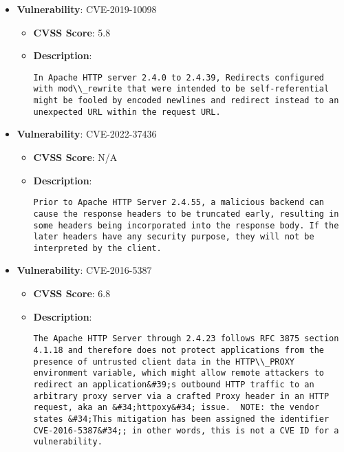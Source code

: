 \documentclass{article}
\begin{document}
\begin{itemize}
        \item \textbf{Vulnerability}: CVE-2019-10098
        \begin{itemize}
            \item \textbf{CVSS Score}:  5.8 
            \item \textbf{Description}:
            \parbox[t]{0.9\linewidth}{
                \verb|In Apache HTTP server 2.4.0 to 2.4.39, Redirects configured with mod\\_rewrite that were intended to be self-referential might be fooled by encoded newlines and redirect instead to an unexpected URL within the request URL.|
            }
        \end{itemize}
    
        \item \textbf{Vulnerability}: CVE-2022-37436
        \begin{itemize}
            \item \textbf{CVSS Score}:  N/A 
            \item \textbf{Description}:
            \parbox[t]{0.9\linewidth}{
                \verb|Prior to Apache HTTP Server 2.4.55, a malicious backend can cause the response headers to be truncated early, resulting in some headers being incorporated into the response body. If the later headers have any security purpose, they will not be interpreted by the client.|
            }
        \end{itemize}
    
        \item \textbf{Vulnerability}: CVE-2016-5387
        \begin{itemize}
            \item \textbf{CVSS Score}:  6.8 
            \item \textbf{Description}:
            \parbox[t]{0.9\linewidth}{
                \verb|The Apache HTTP Server through 2.4.23 follows RFC 3875 section 4.1.18 and therefore does not protect applications from the presence of untrusted client data in the HTTP\\_PROXY environment variable, which might allow remote attackers to redirect an application&#39;s outbound HTTP traffic to an arbitrary proxy server via a crafted Proxy header in an HTTP request, aka an &#34;httpoxy&#34; issue.  NOTE: the vendor states &#34;This mitigation has been assigned the identifier CVE-2016-5387&#34;; in other words, this is not a CVE ID for a vulnerability.|
            }
        \end{itemize}
    

\end{itemize}
\end{document}
